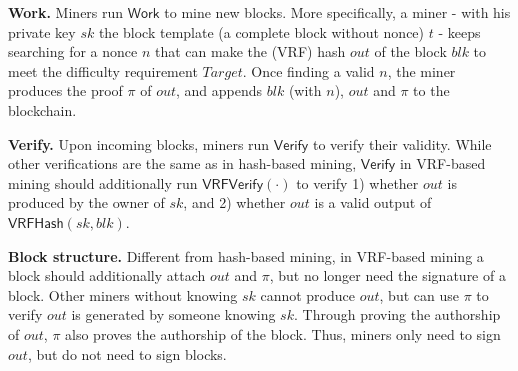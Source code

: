 \textbf{Work.}
Miners run $\mathsf{Work}$ to mine new blocks.
More specifically, a miner - with his private key $sk$ the block template (a complete block without nonce) $t$ - keeps searching for a nonce $n$ that can make the (VRF) hash $out$ of the block $blk$ to meet the difficulty requirement $Target$.
Once finding a valid $n$, the miner produces the proof $\pi$ of $out$, and appends $blk$ (with $n$), $out$ and $\pi$ to the blockchain.

\textbf{Verify.}
Upon incoming blocks, miners run $\mathsf{Verify}$ to verify their validity.
While other verifications are the same as in hash-based mining, $\mathsf{Verify}$ in VRF-based mining should additionally run $\mathsf{VRFVerify}(\cdot)$ to verify 1) whether $out$ is produced by the owner of $sk$, and 2) whether $out$ is a valid output of $\mathsf{VRFHash}(sk, blk)$.

\textbf{Block structure.}
Different from hash-based mining, in VRF-based mining a block should additionally attach $out$ and $\pi$, but no longer need the signature of a block.
Other miners without knowing $sk$ cannot produce $out$, but can use $\pi$ to verify $out$ is generated by someone knowing $sk$.
Through proving the authorship of $out$, $\pi$ also proves the authorship of the block.
Thus, miners only need to sign $out$, but do not need to sign blocks.